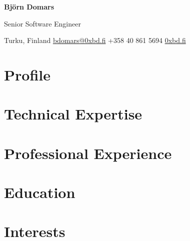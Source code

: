 \documentclass[10pt,a4paper]{article}
\begin{document}
{\Huge\bfseries Björn Domars}

\vspace{0.3em}

{\large\color{muted} Senior Software Engineer}

\vspace{0.5em}

Turku, Finland
\quad\textbullet\quad
\href{mailto:bdomars@0xbd.fi}{bdomars@0xbd.fi}
\quad\textbullet\quad
+358 40 861 5694
\quad\textbullet\quad
\href{https://0xbd.fi}{0xbd.fi}

\section{Profile}


\section{Technical Expertise}


\section{Professional Experience}


\section{Education}


%

\section{Interests}

\end{document}
